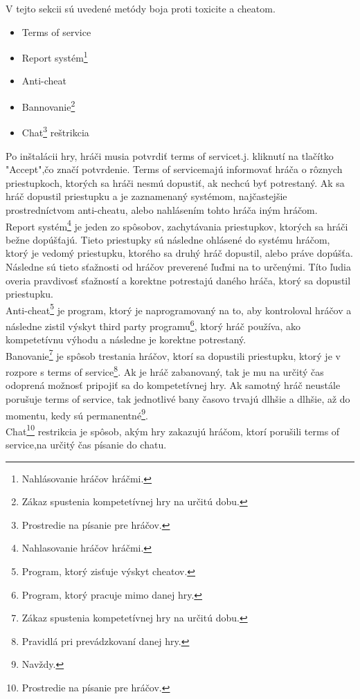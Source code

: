 \documentclass[twoside,twocolumn]{article}
\begin{document}
V tejto sekcii sú uvedené metódy boja proti toxicite a cheatom\footnotemark[1].
\begin{itemize}
\item Terms of service\footnotemark[2] 
\item Report systém\footnote[6]{Nahlásovanie hráčov hráčmi.}
\item Anti-cheat\footnotemark[3]
\item Bannovanie\footnote[7]{Zákaz spustenia kompetetívnej hry na určitú dobu.}
\item Chat\footnote[8]{Prostredie na písanie pre hráčov.} reštrikcia
\end{itemize}
	Po inštalácii hry, hráči musia potvrdiť terms of service\footnotemark[2]t.j. kliknutí na tlačítko "Accept",čo značí potvrdenie. Terms of service\footnotemark[2] majú informovať hráča o rôznych priestupkoch, ktorých sa hráči nesmú dopustiť, ak nechcú byť potrestaný. Ak sa hráč dopustil priestupku a je zaznamenaný systémom, najčastejšie prostredníctvom anti-cheatu\footnotemark[3], alebo nahlásením tohto hráča iným hráčom.\\
	Report systém\footnote[1]{Nahlasovanie hráčov hráčmi.} je jeden zo spôsobov, zachytávania priestupkov, ktorých sa hráči bežne dopúšťajú. Tieto priestupky sú následne ohlásené do systému hráčom, ktorý je vedomý priestupku, ktorého sa druhý hráč dopustil, alebo práve dopúšťa. Následne sú tieto sťažnosti od hráčov preverené ľuďmi na to určenými. Títo ľudia overia pravdivosť sťažností a korektne potrestajú daného hráča, ktorý sa dopustil priestupku.\\
	Anti-cheat\footnote[2]{Program, ktorý zisťuje výskyt cheatov.} je program, ktorý je naprogramovaný na to, aby kontroloval hráčov a následne zistil výskyt third party programu\footnote[3]{Program, ktorý pracuje mimo danej hry.}, ktorý hráč používa, ako kompetetívnu výhodu a následne je korektne potrestaný.\\
	Banovanie\footnote[4]{Zákaz spustenia kompetetívnej hry na určitú dobu.} je spôsob trestania hráčov, ktorí sa dopustili priestupku, ktorý je v rozpore s terms of service\footnote[5]{Pravidlá pri prevádzkovaní danej hry.}. Ak je hráč zabanovaný\footnotemark[4], tak je mu na určitý čas odoprená možnosť pripojiť sa do kompetetívnej hry. Ak samotný hráč neustále porušuje terms of service\footnotemark[5], tak jednotlivé bany časovo trvajú dlhšie a dlhšie, až do momentu, kedy sú permanentné\footnote[6]{Navždy.}.   \\
	Chat\footnote[7]{Prostredie na písanie pre hráčov.} restrikcia je spôsob, akým hry zakazujú hráčom, ktorí porušili terms of service\footnotemark[5],na určitý čas písanie do chatu.
\end{document}
